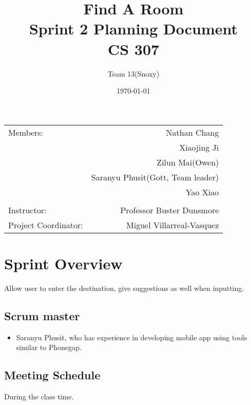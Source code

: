 \documentclass[12pt]{article}
\title{\textbf{Find A Room} \\ Sprint 2 Planning Document \\ CS 307} %
\author{Team \textsc{13}(Snoxy)} %
\date{\today} %
\begin{document}
\maketitle %

\begin{center}
\begin{tabular}{l r}
Members: & Nathan Chang \\ %
& Xiaojing Ji \\
& Zilun Mai(Owen) \\
& Saranyu Phusit(Gott, Team leader) \\
& Yao Xiao \\
\\
\bigskip
Instructor: & Professor Buster Dunsmore \\%
Project Coordinator: & Miguel Villarreal-Vasquez %

\end{tabular}
\end{center}




\newpage

\section{Sprint Overview}

Allow user to enter the destination, give suggestions as well when inputting.


\subsection{Scrum master}
\begin{itemize}
\item Saranyu Phusit, who has experience in developing mobile app using tools similar to Phonegap.
\end{itemize}
\subsection{Meeting Schedule}
During the class time.
\end{document}

